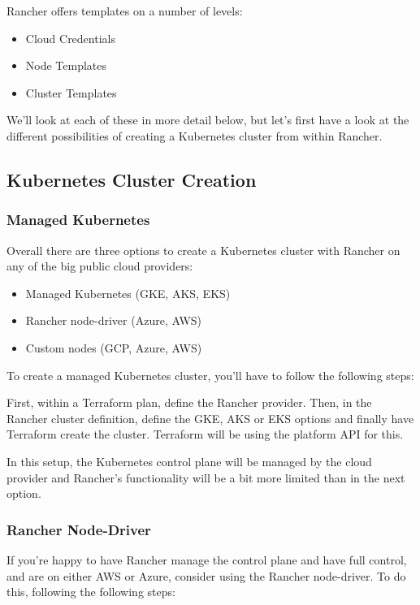 Rancher offers templates on a number of levels:

\begin{itemize}
\item Cloud Credentials
\item Node Templates
\item Cluster Templates
\end{itemize}

We'll look at each of these in more detail below, but let's first have a look at the different possibilities of creating a Kubernetes cluster from within Rancher.

\subsection{Kubernetes Cluster Creation}

\subsubsection{Managed Kubernetes}

Overall there are three options to create a Kubernetes cluster with Rancher on any of the big public cloud providers:

\begin{itemize}
\item Managed Kubernetes (GKE, AKS, EKS)
\item Rancher node-driver (Azure, AWS)
\item Custom nodes (GCP, Azure, AWS)
\end{itemize}

To create a managed Kubernetes cluster, you'll have to follow the following steps:

First, within a  Terraform plan, define the Rancher provider. Then, in the Rancher cluster definition, define the GKE, AKS or EKS options and finally have Terraform create the cluster. Terraform will be using the platform API for this.

In this setup, the Kubernetes control plane will be managed by the cloud provider and Rancher's functionality will be a bit more limited than in the next option.

\subsubsection{Rancher Node-Driver}

If you're happy to have Rancher manage the control plane and have full control, and are on either AWS or Azure, consider using the Rancher node-driver. To do this, following the following steps:

